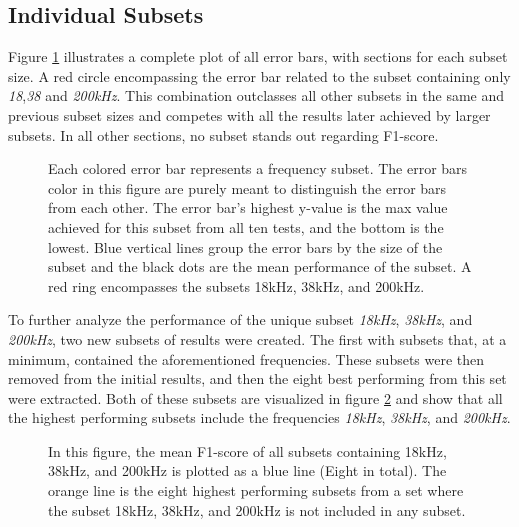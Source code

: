     \subsection{Individual Subsets}
        Figure \ref{errorbar_fig} illustrates a complete plot of all error bars, with sections for each subset size. A red circle encompassing the error bar related to the subset containing only \textit{18},\textit{38} and \textit{200kHz}. This combination outclasses all other subsets in the same and previous subset sizes and competes with all the results later achieved by larger subsets. In all other sections, no subset stands out regarding F1-score.
        \clearpage
        \begin{figure}[H]
            \centering
                        
            \caption[Error bars per combination]{Each colored error bar represents a frequency subset. The error bars color in this figure are purely meant to distinguish the error bars from each other. The error bar's highest y-value is the max value achieved for this subset from all ten tests, and the bottom is the lowest. Blue vertical lines group the error bars by the size of the subset and the black dots are the mean performance of the subset. A red ring encompasses the subsets 18kHz, 38kHz, and 200kHz.}
          	\medskip 
            \label{errorbar_fig}
        \end{figure}
    
        To further analyze the performance of the unique subset \textit{18kHz}, \textit{38kHz}, and \textit{200kHz}, two new subsets of results were created. The first with subsets that, at a minimum, contained the aforementioned frequencies. These subsets were then removed from the initial results, and then the eight best performing from this set were extracted. Both of these subsets are visualized in figure \ref{with_without_figure} and show that all the highest performing subsets include the frequencies \textit{18kHz}, \textit{38kHz}, and \textit{200kHz}.
        
        \begin{figure}[H]
            \centering
            
            \caption[With and without unique subset]{In this figure, the mean F1-score of all subsets containing 18kHz, 38kHz, and 200kHz is plotted as a blue line (Eight in total). The orange line is the eight highest performing subsets from a set where the subset 18kHz, 38kHz, and 200kHz is not included in any subset.}
          	\medskip 
            \label{with_without_figure}
        \end{figure}
        

